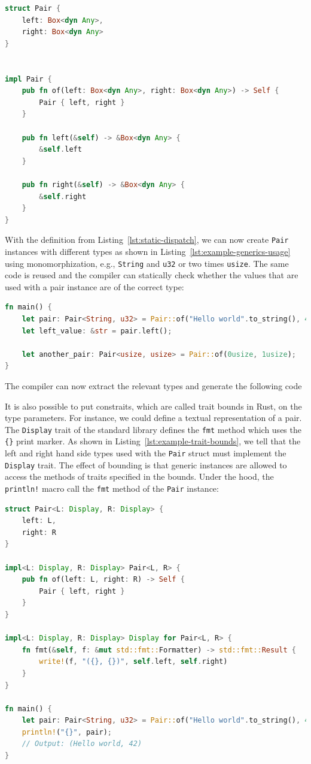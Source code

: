 \documentclass{article}
\begin{document}
\begin{lstlisting}[language=Rust, style=boxed, caption=A data type with dynamic dispatch, label=lst:dynamic-dispatch]
struct Pair {
    left: Box<dyn Any>,
    right: Box<dyn Any>
}


impl Pair {
    pub fn of(left: Box<dyn Any>, right: Box<dyn Any>) -> Self {
        Pair { left, right }
    }

    pub fn left(&self) -> &Box<dyn Any> {
        &self.left
    }

    pub fn right(&self) -> &Box<dyn Any> {
        &self.right
    }
}
\end{lstlisting}

With the definition from Listing~\ref{lst:static-dispatch}, we can now create \lstinline{Pair} instances with different types as shown in Listing~\ref{lst:example-generics-usage} using monomorphization, e.g., \lstinline{String} and \lstinline{u32} or two times \lstinline{usize}. The same code is reused and the compiler can statically check whether the values that are used with a pair instance are of the correct type:
\begin{lstlisting}[language=Rust, style=boxed, caption={}, label=lst:example-generics-usage]
fn main() {
    let pair: Pair<String, u32> = Pair::of("Hello world".to_string(), 42u32);
    let left_value: &str = pair.left();

    let another_pair: Pair<usize, usize> = Pair::of(0usize, 1usize);
}
\end{lstlisting}
The compiler can now extract the relevant types and generate the following code

It is also possible to put constraits, which are called trait bounds in Rust, on the type parameters. For instance, we could define a textual representation of a pair. The \lstinline{Display} trait of the standard library defines the \lstinline{fmt} method which uses the \lstinline|{}| print marker. As shown in Listing~\ref{lst:example-trait-bounds}, we tell that the left and right hand side types used with the \lstinline{Pair} struct must implement the \lstinline{Display} trait. The effect of bounding is that generic instances are allowed to access the methods of traits specified in the bounds. Under the hood, the \lstinline{println!} macro call the \lstinline{fmt} method of the \lstinline{Pair} instance:
\begin{lstlisting}[language=Rust, style=boxed, caption={}, label=lst:example-trait-bounds]
struct Pair<L: Display, R: Display> {
    left: L,
    right: R
}

impl<L: Display, R: Display> Pair<L, R> {
    pub fn of(left: L, right: R) -> Self {
        Pair { left, right }
    }
}

impl<L: Display, R: Display> Display for Pair<L, R> {
    fn fmt(&self, f: &mut std::fmt::Formatter) -> std::fmt::Result {
        write!(f, "({}, {})", self.left, self.right)
    }
}

fn main() {
    let pair: Pair<String, u32> = Pair::of("Hello world".to_string(), 42u32);
    println!("{}", pair);
    // Output: (Hello world, 42)
}
\end{lstlisting}
\end{document}
